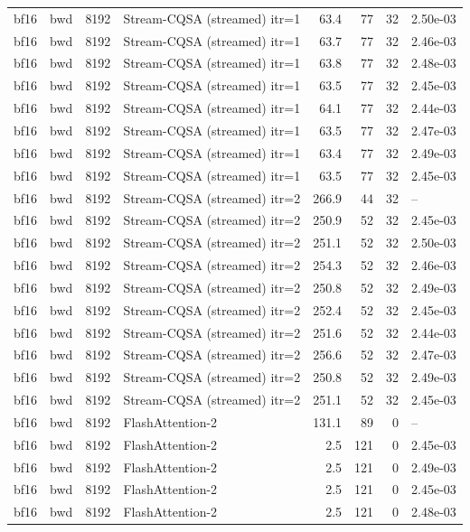\begin{tabular}{llrlrrrl}
bf16 & bwd & 8192 & Stream-CQSA (streamed) itr=1 & 63.4 & 77 & 32 & 2.50e-03 \\
bf16 & bwd & 8192 & Stream-CQSA (streamed) itr=1 & 63.7 & 77 & 32 & 2.46e-03 \\
bf16 & bwd & 8192 & Stream-CQSA (streamed) itr=1 & 63.8 & 77 & 32 & 2.48e-03 \\
bf16 & bwd & 8192 & Stream-CQSA (streamed) itr=1 & 63.5 & 77 & 32 & 2.45e-03 \\
bf16 & bwd & 8192 & Stream-CQSA (streamed) itr=1 & 64.1 & 77 & 32 & 2.44e-03 \\
bf16 & bwd & 8192 & Stream-CQSA (streamed) itr=1 & 63.5 & 77 & 32 & 2.47e-03 \\
bf16 & bwd & 8192 & Stream-CQSA (streamed) itr=1 & 63.4 & 77 & 32 & 2.49e-03 \\
bf16 & bwd & 8192 & Stream-CQSA (streamed) itr=1 & 63.5 & 77 & 32 & 2.45e-03 \\
bf16 & bwd & 8192 & Stream-CQSA (streamed) itr=2 & 266.9 & 44 & 32 & -- \\
bf16 & bwd & 8192 & Stream-CQSA (streamed) itr=2 & 250.9 & 52 & 32 & 2.45e-03 \\
bf16 & bwd & 8192 & Stream-CQSA (streamed) itr=2 & 251.1 & 52 & 32 & 2.50e-03 \\
bf16 & bwd & 8192 & Stream-CQSA (streamed) itr=2 & 254.3 & 52 & 32 & 2.46e-03 \\
bf16 & bwd & 8192 & Stream-CQSA (streamed) itr=2 & 250.8 & 52 & 32 & 2.49e-03 \\
bf16 & bwd & 8192 & Stream-CQSA (streamed) itr=2 & 252.4 & 52 & 32 & 2.45e-03 \\
bf16 & bwd & 8192 & Stream-CQSA (streamed) itr=2 & 251.6 & 52 & 32 & 2.44e-03 \\
bf16 & bwd & 8192 & Stream-CQSA (streamed) itr=2 & 256.6 & 52 & 32 & 2.47e-03 \\
bf16 & bwd & 8192 & Stream-CQSA (streamed) itr=2 & 250.8 & 52 & 32 & 2.49e-03 \\
bf16 & bwd & 8192 & Stream-CQSA (streamed) itr=2 & 251.1 & 52 & 32 & 2.45e-03 \\
bf16 & bwd & 8192 & FlashAttention-2 & 131.1 & 89 & 0 & -- \\
bf16 & bwd & 8192 & FlashAttention-2 & 2.5 & 121 & 0 & 2.45e-03 \\
bf16 & bwd & 8192 & FlashAttention-2 & 2.5 & 121 & 0 & 2.49e-03 \\
bf16 & bwd & 8192 & FlashAttention-2 & 2.5 & 121 & 0 & 2.45e-03 \\
bf16 & bwd & 8192 & FlashAttention-2 & 2.5 & 121 & 0 & 2.48e-03 \\

\end{tabular}
